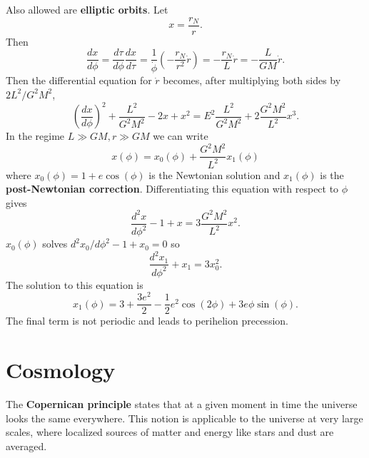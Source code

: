 \documentclass[11pt]{article}
\begin{document}
Also allowed are \textbf{elliptic orbits}.
Let
$$ x = \frac{r_N}{r}. $$
Then
$$ \frac{dx}{d\phi} = \frac{d\tau}{d\phi} \frac{dx}{d\tau} = \frac{1}{\dot{\phi}} \left( - \frac{r_N}{r^2} \dot{r} \right) = - \frac{r_N}{L} \dot{r} = - \frac{L}{GM} \dot{r}. $$
Then the differential equation for $\dot{r}$ becomes, after multiplying both sides by $2 L^2/G^2 M^2$,
$$ \left( \frac{dx}{d\phi} \right)^2 + \frac{L^2}{G^2 M^2} -2x + x^2 = E^2 \frac{L^2}{G^2 M^2} + 2 \frac{G^2 M^2}{L^2} x^3. $$
In the regime $L \gg GM, r \gg GM$ we can write
$$ x(\phi) = x_0(\phi) + \frac{G^2 M^2}{L^2} x_1(\phi) $$
where $x_0(\phi) = 1 + e \cos(\phi)$ is the Newtonian solution and $x_1(\phi)$ is the \textbf{post-Newtonian correction}.
Differentiating this equation with respect to $\phi$ gives
$$ \frac{d^2 x}{d\phi^2} - 1 + x = 3 \frac{G^2 M^2}{L^2} x^2. $$
$x_0(\phi)$ solves $d^2 x_0/d\phi^2 -1 + x_0 = 0$ so 
$$ \frac{d^2 x_1}{d\phi^2} + x_1 = 3x_0^2. $$
The solution to this equation is
$$ x_1(\phi) = 3 + \frac{3 e^2}{2} -\frac{1}{2} e^2 \cos(2\phi) + 3e\phi \sin(\phi). $$
The final term is not periodic and leads to perihelion precession.

\section{Cosmology}

The \textbf{Copernican principle} states that at a given moment in time the universe looks the same everywhere.
This notion is applicable to the universe at very large scales, where localized sources of matter and energy like stars and dust are averaged.
\end{document}
